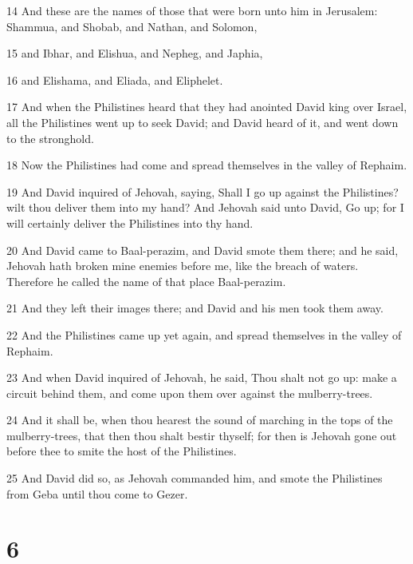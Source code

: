 \par 14 And these are the names of those that were born unto him in Jerusalem: Shammua, and Shobab, and Nathan, and Solomon,
\par 15 and Ibhar, and Elishua, and Nepheg, and Japhia,
\par 16 and Elishama, and Eliada, and Eliphelet.
\par 17 And when the Philistines heard that they had anointed David king over Israel, all the Philistines went up to seek David; and David heard of it, and went down to the stronghold.
\par 18 Now the Philistines had come and spread themselves in the valley of Rephaim.
\par 19 And David inquired of Jehovah, saying, Shall I go up against the Philistines? wilt thou deliver them into my hand? And Jehovah said unto David, Go up; for I will certainly deliver the Philistines into thy hand.
\par 20 And David came to Baal-perazim, and David smote them there; and he said, Jehovah hath broken mine enemies before me, like the breach of waters. Therefore he called the name of that place Baal-perazim.
\par 21 And they left their images there; and David and his men took them away.
\par 22 And the Philistines came up yet again, and spread themselves in the valley of Rephaim.
\par 23 And when David inquired of Jehovah, he said, Thou shalt not go up: make a circuit behind them, and come upon them over against the mulberry-trees.
\par 24 And it shall be, when thou hearest the sound of marching in the tops of the mulberry-trees, that then thou shalt bestir thyself; for then is Jehovah gone out before thee to smite the host of the Philistines.
\par 25 And David did so, as Jehovah commanded him, and smote the Philistines from Geba until thou come to Gezer.

\chapter{6}

